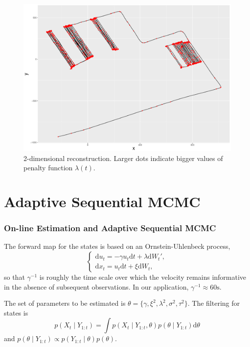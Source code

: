 \documentclass{beamer}
\begin{document}
\begin{frame}

\begin{figure}
\centering
\includegraphics[width=0.9\linewidth]{Chapters/02TractorSplineTheory/plot/ggplot/ggRealdataCompleteXY.pdf}
\caption{2-dimensional reconstruction. Larger dots indicate bigger values of penalty function $\lambda(t)$.}
\end{figure}

\end{frame}


\section{Adaptive Sequential MCMC}

\begin{frame}
\frametitle{On-line Estimation and Adaptive Sequential MCMC}


The forward map for the states is based on an Ornstein-Uhlenbeck process,
\begin{equation}\label{OUprocess}
\begin{cases}
\text{d}u_t = -\gamma u_t \text{d}t+ \lambda \text{d}W_t',\\
\text{d}x_t = u_t \text{d}t+\xi \text{d}W_t,
\end{cases}
\end{equation}
so that $\gamma^{-1}$ is roughly the time scale over which the velocity remains informative in the absence of subsequent observations. In our application, $\gamma^{-1}\approx 60\text{s}$.

The set of parameters to be estimated is $\theta=\{\gamma,\xi^2,\lambda^2,\sigma^2,\tau^2 \}$. The filtering for states is
\begin{equation}\label{filterX}
p(X_t\mid Y_{1:t}) = \int p(X_t\mid Y_{1:t} ,\theta)p(\theta \mid Y_{1:t})\text{d}\theta
\end{equation}
and $p(\theta\mid Y_{1:t}) \propto p(Y_{1:t}\mid \theta)p(\theta)$.

\end{frame}
\end{document}
